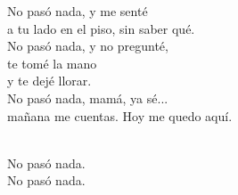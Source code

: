 \begin{lyrics}
No pasó nada, y me senté\\
a tu lado en el piso, sin saber qué.\\
No pasó nada, y no pregunté,\\
te tomé la mano\\
y te dejé llorar.\\
No pasó nada, mamá, ya sé...\\
mañana me cuentas. Hoy me quedo aquí.

\\
No pasó nada.
\\
No pasó nada.
\end{lyrics}

